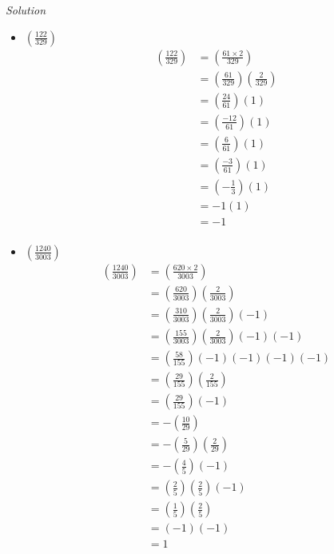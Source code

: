 \documentclass{article}
\begin{document}
\textit{Solution}
\begin{itemize}
    \item $(\frac{122}{329})$ 
    \begin{align*}
        &&(\frac{122}{329}) &= (\frac{61 \times 2}{329})&&\\
        &&                  &= (\frac{61}{329})(\frac{2}{329})&&\\
        &&                  &= (\frac{24}{61})(1)&&\\
        &&                  &= (\frac{-12}{61})(1)&&\\
        &&                  &= (\frac{6}{61})(1)&&\\
        &&                  &= (\frac{-3}{61})(1)&&\\
        &&                  &= (-\frac{1}{3})(1)&&\\
        &&                  &= -1(1)&&\\
        &&                  &= -1&&\\
    \end{align*}
    \item $(\frac{1240}{3003})$ 
    \begin{align*}
        &&(\frac{1240}{3003}) &= (\frac{620 \times 2}{3003})&&\\
        &&                  &= (\frac{620}{3003})(\frac{2}{3003})&&\\
        &&                  &= (\frac{310}{3003})(\frac{2}{3003})(-1)&&\\
        &&                  &= (\frac{155}{3003})(\frac{2}{3003})(-1)(-1)&&\\
        &&                  &= (\frac{58}{155})(-1)(-1)(-1)(-1)&&\\
        &&                  &= (\frac{29}{155})(\frac{2}{155})&&\\
        &&                  &= (\frac{29}{155})(-1)&&\\
        &&                  &= -(\frac{10}{29})&&\\
        &&                  &= -(\frac{5}{29})(\frac{2}{29})&&\\
        &&                  &= -(\frac{4}{5})(-1)&&\\
        &&                  &= (\frac{2}{5})(\frac{2}{5})(-1)&&\\
        &&                  &= (\frac{1}{5})(\frac{2}{5})&&\\
        &&                  &= (-1)(-1)&&\\
        &&                  &= 1&&\\
    \end{align*}
\end{itemize}
\end{document}
